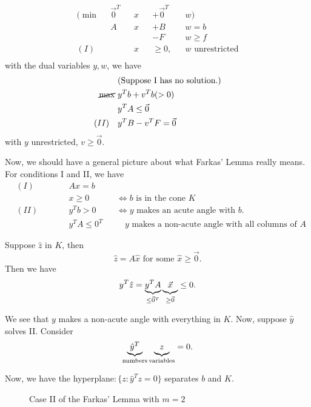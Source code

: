 \begin{eg}
	\[
		\begin{alignedat}{4}
			(\min~   & \vec{0}^{T} &&x &&+ \vec{0}^{T} &&w)            \\
			& A&&x &&+ B&&w = b    \\
			& && &&-F&&w \geq f \\
			(I)\quad & &&x&&\geq  0, &&w\text{ unrestricted}          \\
		\end{alignedat}
	\]
	with the dual variables \(y, w\), we have
	\begin{align*}
		               & (\text{Suppose I has no solution.}) \\
		\cancel{\max}~ & y^{T} b + v^{T} b (>0)              \\
		               & y^{T} A \leq \vec{0}                \\
		(II)\quad      & y^{T} B - v^{T} F = \vec{0}
	\end{align*}
	with \(y\) unrestricted, \(v\geq  \vec{0}\).
\end{eg}

\hr

Now, we should have a general picture about what Farkas' Lemma really means. For conditions I and II, we have
\[
	\begin{alignedat}{3}
		& (I) \qquad&& Ax = b       \\
		&      && x\geq 0    && \iff b \text{ is in the cone }K \\
		& (II) \qquad&& y^{T}b> 0 &&\iff y \text{ makes an acute angle with }b.\\
		&      && y^{T}A\leq 0^{T}&&\quad y\text{ makes a non-acute angle with all columns of }A
	\end{alignedat}
\]

Suppose \(\hat{z}\) in \(K\), then
\[
	\hat{z} = A \hat{x} \text{ for some }\hat{x} \geq  \vec{0}.
\]
Then we have
\[
	y^{T} \hat{z} = \underbrace{y^{T} A}_{\leq\vec{0}^{T}} \underbrace{\vphantom{y}\vec{x}}_{\geq  \vec{0}}  \leq 0.
\]

We see that \(y\) makes a non-acute angle with everything in \(K\). Now, suppose \(\hat{y}\) solves II. Consider
\[
	\underbrace{\hat{y}^{T}}_{\text{numbers}} \underbrace{\vphantom{y}z}_{\text{variables}} = 0.
\]

Now, we have the hyperplane\(\colon\)\(\{z\colon \hat{y} ^{T} z = 0\}\) separates \(b\) and \(K\).

\begin{figure}[H]
	\centering
	\caption{Case II of the Farkas' Lemma with \(m = 2\)}
	\label{fig:Farkas-lemma-extended}
\end{figure}

